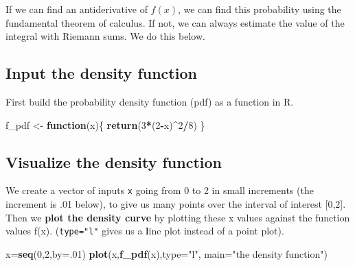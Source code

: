 \documentclass[
]{book}
\newenvironment{Shaded}{\begin{snugshade}}{\end{snugshade}}
\newcommand{\AttributeTok}[1]{\textcolor[rgb]{0.13,0.29,0.53}{#1}}
\newcommand{\ControlFlowTok}[1]{\textcolor[rgb]{0.13,0.29,0.53}{\textbf{#1}}}
\newcommand{\DecValTok}[1]{\textcolor[rgb]{0.00,0.00,0.81}{#1}}
\newcommand{\FunctionTok}[1]{\textcolor[rgb]{0.13,0.29,0.53}{\textbf{#1}}}
\newcommand{\NormalTok}[1]{#1}
\newcommand{\OtherTok}[1]{\textcolor[rgb]{0.56,0.35,0.01}{#1}}
\newcommand{\SpecialCharTok}[1]{\textcolor[rgb]{0.81,0.36,0.00}{\textbf{#1}}}
\newcommand{\StringTok}[1]{\textcolor[rgb]{0.31,0.60,0.02}{#1}}
\theoremstyle{definition}
\theoremstyle{definition}
\theoremstyle{definition}
\theoremstyle{definition}
\theoremstyle{remark}
\begin{document}
If we can find an antiderivative of \(f(x)\), we can find this probability using the fundamental theorem of calculus. If not, we can always estimate the value of the integral with Riemann sums. We do this below.

\subsection*{Input the density function}\label{input-the-density-function}

First build the probability density function (pdf) as a function in R.

\begin{Shaded}
\begin{Highlighting}[]
\NormalTok{f\_pdf }\OtherTok{\textless{}{-}} \ControlFlowTok{function}\NormalTok{(x)\{}
  \FunctionTok{return}\NormalTok{(}\DecValTok{3}\SpecialCharTok{*}\NormalTok{(}\DecValTok{2}\SpecialCharTok{{-}}\NormalTok{x)}\SpecialCharTok{\^{}}\DecValTok{2}\SpecialCharTok{/}\DecValTok{8}\NormalTok{)}
\NormalTok{\}}
\end{Highlighting}
\end{Shaded}

\subsection*{Visualize the density function}\label{visualize-the-density-function}

We create a vector of inputs \texttt{x} going from 0 to 2 in small increments (the increment is .01 below), to give us many points over the interval of interest {[}0,2{]}. Then we \textbf{plot the density curve} by plotting these x values against the function values f(x). (\texttt{type="l"} gives us a \textbf{l}ine plot instead of a point plot).

\begin{Shaded}
\begin{Highlighting}[]
\NormalTok{x}\OtherTok{=}\FunctionTok{seq}\NormalTok{(}\DecValTok{0}\NormalTok{,}\DecValTok{2}\NormalTok{,}\AttributeTok{by=}\NormalTok{.}\DecValTok{01}\NormalTok{)}
\FunctionTok{plot}\NormalTok{(x,}\FunctionTok{f\_pdf}\NormalTok{(x),}\AttributeTok{type=}\StringTok{"l"}\NormalTok{,}
     \AttributeTok{main=}\StringTok{"the density function"}\NormalTok{)}
\end{Highlighting}
\end{Shaded}
\end{document}
